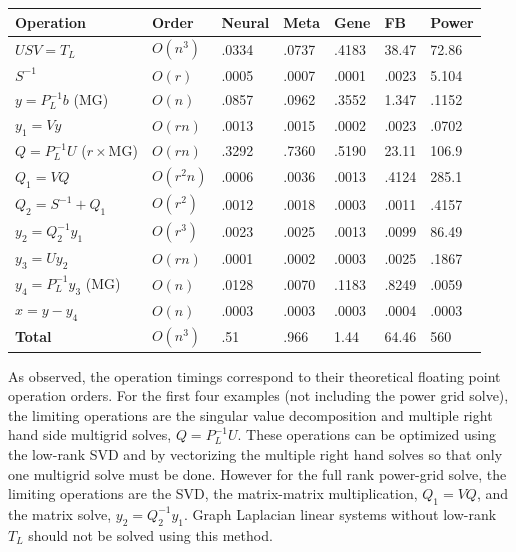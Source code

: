 \documentclass{article}
\begin{document}
\begin{center}
\renewcommand{\arraystretch}{1.5}
    \begin{tabular}{ | l | l | l | l | l | l | l |}
    \hline
    \textbf{Operation} & \textbf{Order} & \textbf{Neural} & \textbf{Meta} & \textbf{Gene} & \textbf{FB} & \textbf{Power} \\ \hline
    $USV = T_L$ & $O(n^3)$ & .0334 & .0737 & .4183 & 38.47 & 72.86  \\ \hline
    $S^{-1}$ & $O(r)$ & .0005 & .0007 & .0001 & .0023 & 5.104 \\ \hline
    $y = P_L^{-1}b$ (MG) & $O(n)$ & .0857 & .0962 & .3552 & 1.347 & .1152  \\  \hline
    $y_1 = Vy$ & $O(rn)$ & .0013 & .0015 & .0002 & .0023 & .0702 \\ \hline
    $Q = P_L^{-1}U$ ($r\times$MG) & $O(rn)$ & .3292 & .7360 & .5190 & 23.11 & 106.9  \\ \hline
    $Q_1 = VQ$ & $O(r^2 n)$ & .0006 & .0036 & .0013 & .4124 & 285.1 \\ \hline
    $Q_2 = S^{-1} + Q_1$ & $O(r^2)$ & .0012 & .0018 & .0003 & .0011 & .4157 \\ \hline
    $y_2 = Q_2^{-1}y_1$ & $O(r^3)$ & .0023 & .0025 & .0013 & .0099 & 86.49 \\ \hline
    $y_3 = Uy_2$ & $O(rn)$ & .0001 & .0002 & .0003 & .0025 & .1867 \\ \hline
    $y_4 = P_L^{-1}y_3$ (MG) & $O(n)$ &.0128 & .0070 & .1183 & .8249 & .0059 \\ \hline
    $x = y - y_4$ & $O(n)$ &.0003 & .0003 & .0003 & .0004 & .0003 \\ \hline
    \textbf{Total} & $O(n^3)$ & .51 & .966 & 1.44 & 64.46 & 560 \\
    \hline
    \end{tabular}
\end{center}
As observed, the operation timings correspond to their theoretical floating point operation orders. For the first four examples (not including the power grid solve), the limiting operations are the singular value decomposition and multiple right hand side multigrid solves, $Q = P_L^{-1}U$. These operations can be optimized using the low-rank SVD and by vectorizing the multiple right hand solves so that only one multigrid solve must be done. However for the full rank power-grid solve, the limiting operations are the SVD, the matrix-matrix multiplication, $Q_1 = VQ$, and the matrix solve, $y_2 = Q_2^{-1}y_1$. Graph Laplacian linear systems without low-rank $T_L$ should not be solved using this method.



\end{document}
